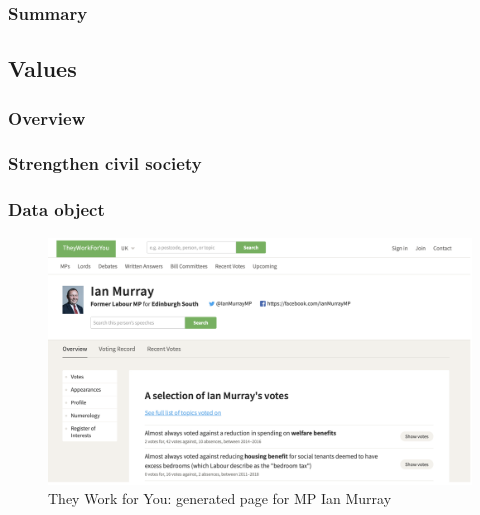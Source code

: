 \documentclass{article}
\begin{document}
        	\subsubsection*{Summary}
        	
        	        	          	  
        \subsection*{Values}

        	\subsubsection*{Overview}
        	

        	\subsubsection*{Strengthen civil society}
        	

        	\subsubsection*{Data object}
        	

			\begin{figure}[h]
				\centering
				\includegraphics[scale=0.5]{images/they-work-for-you-ian-murray}
				\caption{They Work for You: generated page for MP Ian Murray}
				\label{fig:they-work-for-you-ian-murray}
			\end{figure}
			
\end{document}
